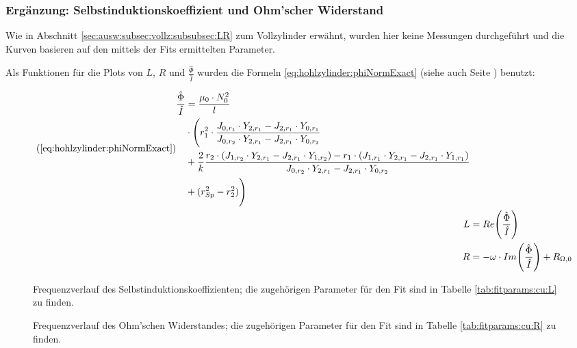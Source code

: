 \subsubsection{Erg\"anzung: Selbstinduktionskoeffizient und Ohm'scher Widerstand}
\label{sec:ausw:subsec:hohlz:cu:subsubsec:LR}

Wie  in  Abschnitt \ref{sec:ausw:subsec:vollz:subsubsec:LR}  zum  Vollzylinder
erw\"ahnt, wurden hier keine Messungen  durchgef\"uhrt und die Kurven basieren
auf den mittels der Fits ermittelten Parameter.

Als Funktionen f\"ur  die Plots von $L$,  $R$ und $\frac{\hat{\Phi}}{\hat{I}}$
wurden  die  Formeln   \ref{eq:hohlzylinder:phiNormExact}  (siehe  auch  Seite
\pageref{eq:hohlzylinder:phiNormExact}) benutzt:

\begin{align*}
    \tag{\ref{eq:hohlzylinder:phiNormExact}}
    \begin{split}
    \frac{\hat{\Phi}}{\hat{I}} & = \frac{\mu_0 \cdot N_0^2}{l} \\
                               & \cdot \Biggl( r_1^2 \cdot \frac{J_{0,r_1} \cdot Y_{2,r_1} - J_{2,r_1} \cdot Y_{0,r_1}}{J_{0,r_2} \cdot Y_{2,r_1} - J_{2,r_1} \cdot Y_{0,r_2}} \\
                               & + \frac{2}{k} \frac{r_2 \cdot (J_{1,r_2} \cdot Y_{2,r_1} - J_{2,r_1} \cdot Y_{1,r_2}) - r_1 \cdot (J_{1,r_1} \cdot Y_{2,r_1} - J_{2,r_1} \cdot Y_{1,r_1})}{J_{0,r_2} \cdot Y_{2,r_1} - J_{2,r_1} \cdot Y_{0,r_2}} \\
                               & + (r_{Sp}^2 - r_2^2) \Biggr)
    \end{split} \\
    L & = Re \Biggl(\frac{\hat{\Phi}}{\hat{I}} \Biggr) \\
    R & = - \omega \cdot Im \Biggl(\frac{\hat{\Phi}}{\hat{I}} \Biggr) + R_{\Omega,0}
\end{align*}

\clearpage
\begin{figure}[h!]
    \resizebox{\textwidth}{!}{}
    \caption{
        Frequenzverlauf  des Selbstinduktionskoeffizienten;  die zugeh\"origen
        Parameter f\"ur  den Fit  sind in Tabelle  \ref{tab:fitparams:cu:L} zu
        finden.
    }
    \label{fig:cu:freq:L}
\end{figure}
\begin{figure}[h!]
    \resizebox{\textwidth}{!}{}
    \caption{
        Frequenzverlauf   des   Ohm'schen  Widerstandes;   die   zugeh\"origen
        Parameter f\"ur  den Fit  sind in Tabelle  \ref{tab:fitparams:cu:R} zu
        finden.
    }
    \label{fig:cu:freq:R}
\end{figure}


